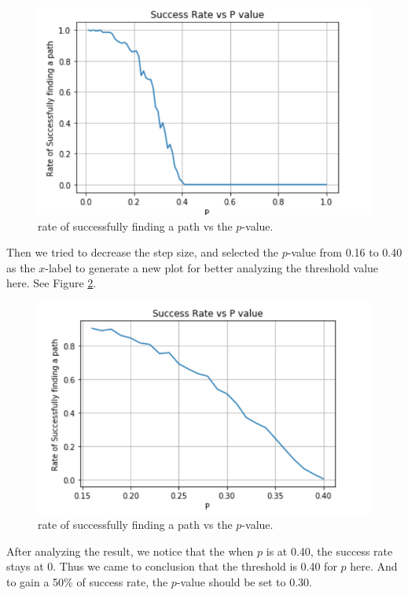 \documentclass[letter]{article}
\begin{document}
\begin{questions}
	\begin{figure}
		\centering
		\includegraphics[width=\textwidth]{../pics/question3-1.png}
		\caption{\label{fig:3-1}rate of successfully finding a path vs the $ p $-value.}
	\end{figure}
	
	Then we tried to decrease the step size, and selected the $ p $-value from 0.16 to 0.40 as the $ x $-label to generate a new plot for better analyzing the threshold value here. See Figure \ref{fig:3-2}.\\
	
	\begin{figure}
		\centering
		\includegraphics[width=\textwidth]{../pics/question3-2.png}
		\caption{\label{fig:3-2}rate of successfully finding a path vs the $ p $-value.}
	\end{figure}

	After analyzing the result, we notice that the when $ p $ is at 0.40, the success rate stays at 0. Thus we came to conclusion that the threshold is 0.40 for $ p $ here. And to gain a  50\%  of success rate, the $ p $-value should be set to 0.30. \\
	

\end{questions}
\end{document}
